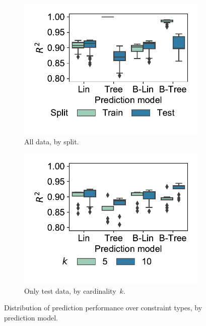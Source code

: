 \begin{figure}[t]
	\centering
	\begin{subfigure}{0.48\textwidth}
		\centering
		\includegraphics[width=\textwidth, trim=15 25 15 15, clip]{plots/ms-prediction-performance-split.pdf}
		\caption{All data, by split.}
		\label{fig:ms:prediction-performance-split}
	\end{subfigure}
	\hfill
	\begin{subfigure}{0.48\textwidth}
		\centering
		\includegraphics[width=\textwidth, trim=15 25 15 15, clip]{plots/ms-prediction-performance-cardinality.pdf}
		\caption{Only test data, by cardinality~$k$.}
		\label{fig:ms:prediction-performance-cardinality}
	\end{subfigure}
	\caption{Distribution of prediction performance over constraint types, by prediction model.}
	\label{fig:ms:prediction-performance}
\end{figure}

